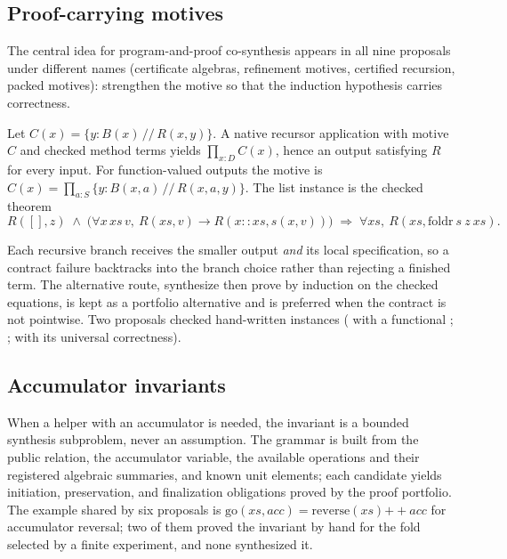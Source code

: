 \subsection{Proof-carrying motives}\label{sec:certified-motive}

The central idea for program-and-proof co-synthesis appears in all nine proposals under different names (certificate algebras, refinement motives, certified recursion, packed motives): strengthen the motive so that the induction hypothesis carries correctness.

\begin{proposition}\label{prop:algebra}
Let $C(x) = \{y : B(x) \,//\, R(x, y)\}$. A native recursor application with motive $C$ and checked method terms yields $\prod_{x:D} C(x)$, hence an output satisfying $R$ for every input. For function-valued outputs the motive is $C(x) = \prod_{a:S}\{y : B(x,a) \,//\, R(x,a,y)\}$. The list instance is the checked theorem
\[
R([], z) \;\wedge\; \big(\forall x\,xs\,v,\ R(xs, v) \to R(x{::}xs, s(x,v))\big) \;\Rightarrow\; \forall xs,\ R(xs, \mathrm{foldr}\ s\ z\ xs).
\]
\end{proposition}

Each recursive branch receives the smaller output \emph{and} its local specification, so a contract failure backtracks into the branch choice rather than rejecting a finished term. The alternative route, synthesize then prove by induction on the checked equations, is kept as a portfolio alternative and is preferred when the contract is not pointwise. Two proposals checked hand-written instances ( with a functional ; ;  with its universal correctness).

\subsection{Accumulator invariants}

When a helper with an accumulator is needed, the invariant is a bounded synthesis subproblem, never an assumption. The grammar is built from the public relation, the accumulator variable, the available operations and their registered algebraic summaries, and known unit elements; each candidate yields initiation, preservation, and finalization obligations proved by the proof portfolio. The example shared by six proposals is $\mathrm{go}(xs, acc) = \mathrm{reverse}(xs) \mathbin{+\!\!+} acc$ for accumulator reversal; two of them proved the invariant by hand for the fold selected by a finite experiment, and none synthesized it.

